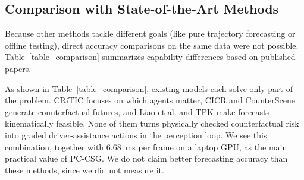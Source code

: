 \documentclass[preprint,12pt]{elsarticle}
\begin{document}
\subsection{Comparison with State-of-the-Art Methods}
Because other methods tackle different goals (like pure trajectory forecasting or offline testing), direct accuracy comparisons on the same data were not possible. Table~\ref{table_comparison} summarizes capability differences based on published papers.

\begin{table}[H]
\caption{Capability comparison with related methods, based on the descriptions in the original papers. Latency is given only for PC-CSG because the other papers do not report it on comparable hardware.}
\centering
\label{table_comparison}
\end{table}

As shown in Table~\ref{table_comparison}, existing models each solve only part of the problem. CRiTIC \cite{ahmadi2025critic} focuses on which agents matter, CICR \cite{han2025cicr} and CounterScene \cite{jing2026counterscene} generate counterfactual futures, and Liao et al. \cite{liao2024physics} and TPK \cite{baden2025tpk} make forecasts kinematically feasible. None of them turns physically checked counterfactual risk into graded driver-assistance actions in the perception loop. We see this combination, together with 6.68~ms per frame on a laptop GPU, as the main practical value of PC-CSG. We do not claim better forecasting accuracy than these methods, since we did not measure it.
\end{document}
